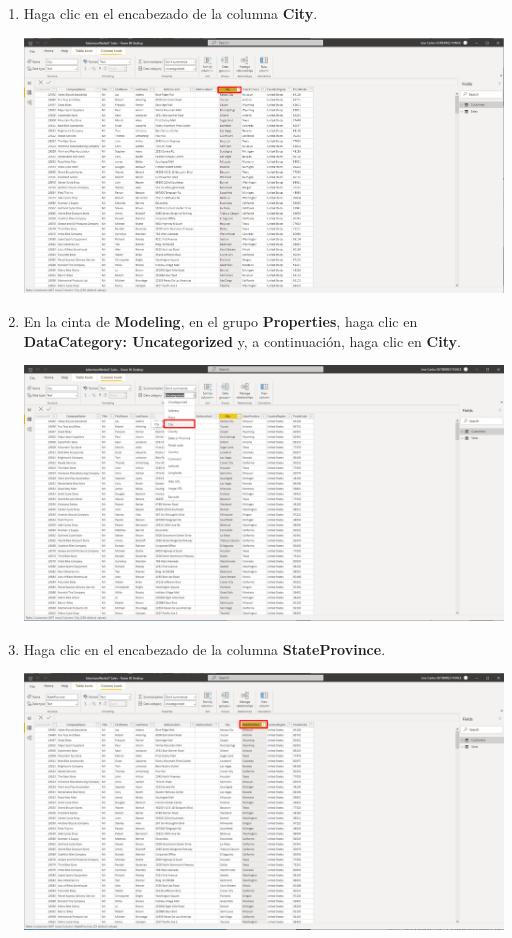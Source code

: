 \documentclass[12pt,letterpaper]{article}
\newcommand\tab[1][1cm]{\hspace*{#1}}
\begin{document}
\begin{enumerate}[\tab 1.]
\begin{center}
        \end{center}
        \item Haga clic en el encabezado de la columna \textbf{City}.
        \begin{center}
            \includegraphics[width=13cm]{./img/img26.png}
        \end{center}
        \item En la cinta de \textbf{Modeling}, en el grupo \textbf{Properties}, haga clic en \textbf{DataCategory: Uncategorized} y, a continuación, haga clic en \textbf{City}.
        \begin{center}
            \includegraphics[width=13cm]{./img/img27.png}
        \end{center}
        \item Haga clic en el encabezado de la columna \textbf{StateProvince}.
        \begin{center}
            \includegraphics[width=13cm]{./img/img28.png}

\end{center}
\end{enumerate}
\end{document}
